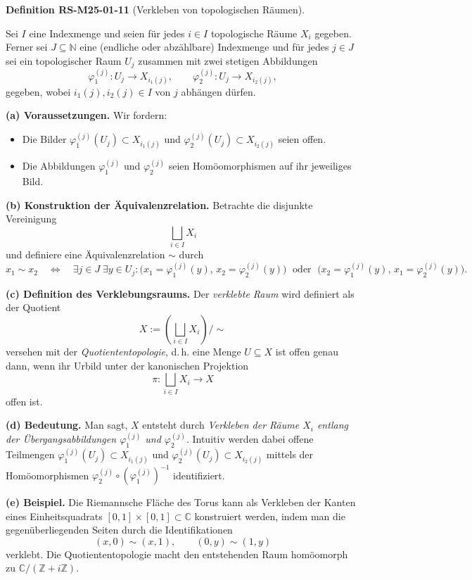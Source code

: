 \documentclass[10pt, letterpaper]{article}
\newcommand{\CustomHeading}[3]{%
  \par\medskip\noindent%
  \textbf{#1 #2} \textnormal{(#3)}.\enskip%
}
\newenvironment{DEF}[2]{\begin{unitbox}\CustomHeading{Definition}{#1}{#2}}{\end{unitbox}}
\begin{document}
\begin{DEF}{RS-M25-01-11}{Verkleben von topologischen Räumen}
Sei $I$ eine Indexmenge und seien für jedes $i \in I$ topologische Räume $X_{i}$ gegeben.  
Ferner sei $J \subseteq \mathbb{N}$ eine (endliche oder abzählbare) Indexmenge und für jedes $j \in J$ sei ein topologischer Raum $U_{j}$ zusammen mit zwei stetigen Abbildungen
\[
\varphi_{1}^{(j)} : U_{j} \longrightarrow X_{i_{1}(j)}, 
\qquad
\varphi_{2}^{(j)} : U_{j} \longrightarrow X_{i_{2}(j)},
\]
gegeben, wobei $i_{1}(j), i_{2}(j) \in I$ von $j$ abhängen dürfen.

\textbf{(a) Voraussetzungen.}  
Wir fordern:
\begin{itemize}
  \item Die Bilder $\varphi_{1}^{(j)}(U_{j}) \subset X_{i_{1}(j)}$ und $\varphi_{2}^{(j)}(U_{j}) \subset X_{i_{2}(j)}$ seien offen.
  \item Die Abbildungen $\varphi_{1}^{(j)}$ und $\varphi_{2}^{(j)}$ seien Homöomorphismen auf ihr jeweiliges Bild.
\end{itemize}

\textbf{(b) Konstruktion der Äquivalenzrelation.}  
Betrachte die disjunkte Vereinigung
\[
\bigsqcup_{i \in I} X_{i}
\]
und definiere eine Äquivalenzrelation $\sim$ durch
\[
x_{1} \sim x_{2}
\quad \Longleftrightarrow \quad
\exists j \in J \; \exists y \in U_{j} :
\bigl( x_{1} = \varphi_{1}^{(j)}(y),\, x_{2} = \varphi_{2}^{(j)}(y) \bigr)
\;\text{ oder }\;
\bigl( x_{2} = \varphi_{1}^{(j)}(y),\, x_{1} = \varphi_{2}^{(j)}(y) \bigr).
\]

\textbf{(c) Definition des Verklebungsraums.}  
Der \emph{verklebte Raum} wird definiert als der Quotient
\[
X := \left( \bigsqcup_{i \in I} X_{i} \right) \Big/ \sim
\]
versehen mit der \emph{Quotiententopologie}, d.\,h. eine Menge $U \subseteq X$ ist offen genau dann, wenn ihr Urbild unter der kanonischen Projektion
\[
\pi : \bigsqcup_{i \in I} X_{i} \longrightarrow X
\]
offen ist.

\textbf{(d) Bedeutung.}  
Man sagt, $X$ entsteht durch \emph{Verkleben der Räume $X_{i}$ entlang der Übergangsabbildungen $\varphi_{1}^{(j)}$ und $\varphi_{2}^{(j)}$}.  
Intuitiv werden dabei offene Teilmengen $\varphi_{1}^{(j)}(U_{j}) \subset X_{i_{1}(j)}$ und $\varphi_{2}^{(j)}(U_{j}) \subset X_{i_{2}(j)}$ mittels der Homöomorphismen $\varphi_{2}^{(j)} \circ (\varphi_{1}^{(j)})^{-1}$ identifiziert.

\textbf{(e) Beispiel.}  
Die Riemannsche Fläche des Torus kann als Verkleben der Kanten eines Einheitsquadrats $[0,1] \times [0,1] \subset \mathbb{C}$ konstruiert werden, indem man die gegenüberliegenden Seiten durch die Identifikationen
\[
(x,0) \sim (x,1), \qquad (0,y) \sim (1,y)
\]
verklebt.  
Die Quotiententopologie macht den entstehenden Raum homöomorph zu $\mathbb{C}/(\mathbb{Z} + i\mathbb{Z})$.
\end{DEF}
\end{document}
